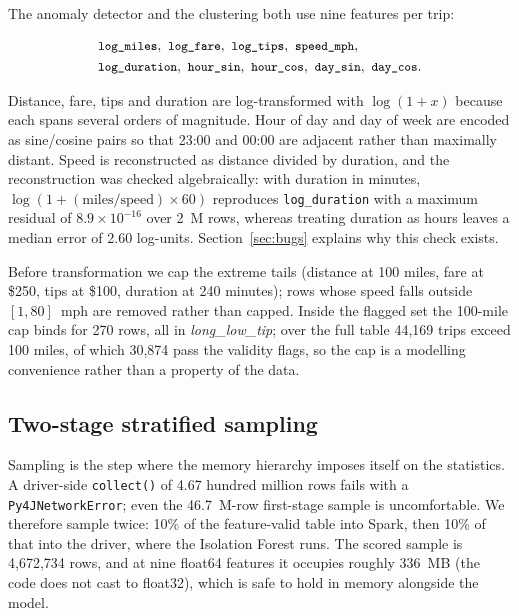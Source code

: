 \documentclass[11pt,a4paper]{article}
\newcommand{\code}[1]{\texttt{\small #1}}
\begin{document}
The anomaly detector and the clustering both use nine features per trip:

\begin{equation}
\begin{aligned}
&\code{log\_miles},\ \code{log\_fare},\ \code{log\_tips},\ \code{speed\_mph},\\
&\code{log\_duration},\ \code{hour\_sin},\ \code{hour\_cos},\ \code{day\_sin},\ \code{day\_cos}.
\end{aligned}
\end{equation}

Distance, fare, tips and duration are log-transformed with $\log(1+x)$ because each spans several orders of magnitude. Hour of day and day of week are encoded as sine/cosine pairs so that 23:00 and 00:00 are adjacent rather than maximally distant. Speed is reconstructed as distance divided by duration, and the reconstruction was checked algebraically: with duration in minutes, $\log(1+(\text{miles}/\text{speed}) \times 60)$ reproduces \code{log\_duration} with a maximum residual of $8.9 \times 10^{-16}$ over 2~M rows, whereas treating duration as hours leaves a median error of 2.60 log-units. Section~\ref{sec:bugs} explains why this check exists.

Before transformation we cap the extreme tails (distance at 100 miles, fare at \$250, tips at \$100, duration at 240 minutes); rows whose speed falls outside $[1,80]$~mph are removed rather than capped. Inside the flagged set the 100-mile cap binds for 270 rows, all in \emph{long\_low\_tip}; over the full table 44{,}169 trips exceed 100 miles, of which 30{,}874 pass the validity flags, so the cap is a modelling convenience rather than a property of the data.

\subsection{Two-stage stratified sampling}

Sampling is the step where the memory hierarchy imposes itself on the statistics. A driver-side \code{collect()} of 4.67 hundred million rows fails with a \code{Py4JNetworkError}; even the 46.7~M-row first-stage sample is uncomfortable. We therefore sample twice: 10\% of the feature-valid table into Spark, then 10\% of that into the driver, where the Isolation Forest runs. The scored sample is 4{,}672{,}734 rows, and at nine float64 features it occupies roughly 336~MB (the code does not cast to float32), which is safe to hold in memory alongside the model.
\end{document}
